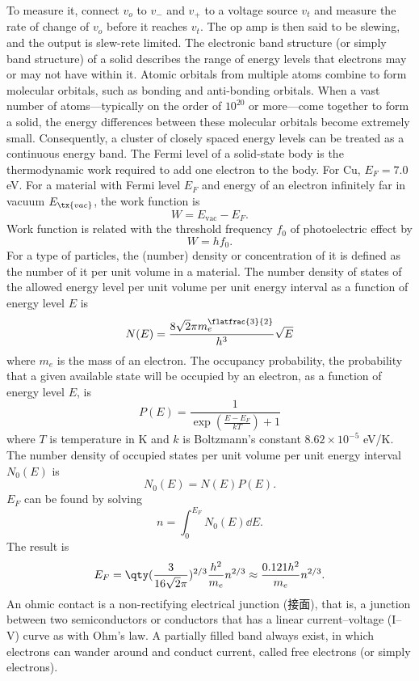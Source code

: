\documentclass[a4paper,12pt]{report}
\begin{document}
To measure it, connect $v_o$ to $v_-$ and $v_+$ to a voltage source $v_t$ and measure the rate of change of $v_o$ before it reaches $v_t$. The op amp is then said to be slewing, and the output is slew-rete limited.
The electronic band structure (or simply band structure) of a solid describes the range of energy levels that electrons may or may not have within it.
Atomic orbitals from multiple atoms combine to form molecular orbitals, such as bonding and anti-bonding orbitals. When a vast number of atoms—typically on the order of $10^{20}$ or more—come together to form a solid, the energy differences between these molecular orbitals become extremely small. Consequently, a cluster of closely spaced energy levels can be treated as a continuous energy band.
The Fermi level of a solid-state body is the thermodynamic work required to add one electron to the body. For Cu, $E_F=7.0$ eV.
For a material with Fermi level $E_F$ and energy of an electron infinitely far in vacuum $E_{\tx{vac}}$, the work function is
\[W=E_{\text{vac}}-E_F.\]
Work function is related with the threshold frequency $f_0$ of photoelectric effect by
\[W=hf_0.\]
For a type of particles, the (number) density or concentration of it is defined as the number of it per unit volume in a material.
The number density of states of the allowed energy level per unit volume per unit energy interval as a function of energy level $E$ is
\[N(E)=\frac{8\sqrt{2}\pi m_e^{\flatfrac{3}{2}}}{h^3}\sqrt{E}\]
where $m_e$ is the mass of an electron.
The occupancy probability, the probability that a given available state will be occupied by an electron, as a function of energy level $E$, is
\[P(E)=\frac{1}{\exp(\frac{E-E_F}{kT})+1}\]
where $T$ is temperature in K and $k$ is Boltzmann's constant $8.62\times 10^{-5}$ eV/K.
The number density of occupied states per unit volume per unit energy interval $N_0(E)$ is
\[N_0(E)=N(E)P(E).\]
$E_F$ can be found by solving
\[n=\int_0^{E_F}N_0(E)\dd{E}.\]
The result is
\[E_F=\qty(\frac{3}{16\sqrt{2}\pi})^{2/3}\frac{h^2}{m_e}n^{2/3}\approx\frac{0.121h^2}{m_e}n^{2/3}.\]
An ohmic contact is a non-rectifying electrical junction (接面), that is, a junction between two semiconductors or conductors that has a linear current–voltage (I–V) curve as with Ohm's law.
A partially filled band always exist, in which electrons can wander around and conduct current, called free electrons (or simply electrons).
\end{document}
